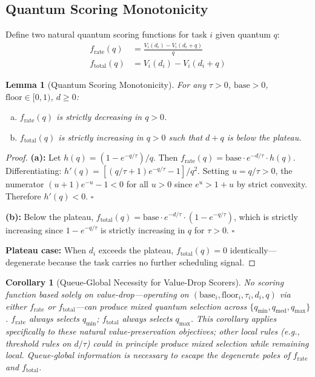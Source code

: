 \documentclass[10pt,twocolumn]{article}
\newtheorem{lemma}[theorem]{Lemma}
\newtheorem{corollary}[theorem]{Corollary}
\theoremstyle{remark}
\begin{document}
\subsection{Quantum Scoring Monotonicity}
\label{sec:lemma}

Define two natural quantum scoring functions for task $i$ given
quantum $q$:
\begin{align}
  f_{\mathrm{rate}}(q) &= \frac{V_i(d_i) - V_i(d_i+q)}{q}
  \label{eq:frate}\\
  f_{\mathrm{total}}(q) &= V_i(d_i) - V_i(d_i+q)
  \label{eq:ftotal}
\end{align}

\begin{lemma}[Quantum Scoring Monotonicity]
\label{lem:mono}
For any $\tau > 0$, $\mathrm{base} > 0$, $\mathrm{floor} \in [0,1)$,
$d \geq 0$:
\begin{enumerate}[(a)]
  \item $f_{\mathrm{rate}}(q)$ is strictly decreasing in $q > 0$.
  \item $f_{\mathrm{total}}(q)$ is strictly increasing in $q > 0$
    such that $d+q$ is below the plateau.
\end{enumerate}
\end{lemma}

\begin{proof}
\textbf{(a):} Let $h(q) = (1-e^{-q/\tau})/q$. Then
$f_{\mathrm{rate}}(q) = \mathrm{base}\cdot e^{-d/\tau}\cdot h(q)$.
Differentiating: $h'(q) = [(q/\tau+1)e^{-q/\tau}-1]/q^2$.
Setting $u=q/\tau>0$, the numerator $(u+1)e^{-u}-1<0$ for all $u>0$
since $e^u>1+u$ by strict convexity. Therefore $h'(q)<0$. \hfill$\square$

\textbf{(b):} Below the plateau, $f_{\mathrm{total}}(q) =
\mathrm{base}\cdot e^{-d/\tau}\cdot(1-e^{-q/\tau})$, which is
strictly increasing since $1-e^{-q/\tau}$ is strictly increasing
in $q$ for $\tau>0$. \hfill$\square$

\textbf{Plateau case:} When $d_i$ exceeds the plateau,
$f_{\mathrm{total}}(q)=0$ identically---degenerate because the task
carries no further scheduling signal.
\end{proof}

\begin{corollary}[Queue-Global Necessity for Value-Drop Scorers]
\label{cor:global}
No scoring function based solely on value-drop---operating on
$(\mathrm{base}_i, \mathrm{floor}_i, \tau_i, d_i, q)$ via either
$f_{\mathrm{rate}}$ or $f_{\mathrm{total}}$---can produce mixed
quantum selection across $\{q_{\min}, q_{\mathrm{med}}, q_{\max}\}$.
$f_{\mathrm{rate}}$ always selects $q_{\min}$; $f_{\mathrm{total}}$
always selects $q_{\max}$. This corollary applies specifically to
these natural value-preservation objectives; other local rules
(e.g., threshold rules on $d/\tau$) could in principle produce mixed
selection while remaining local. Queue-global information is necessary
to escape the degenerate poles of $f_{\mathrm{rate}}$ and
$f_{\mathrm{total}}$.
\end{corollary}
\end{document}
